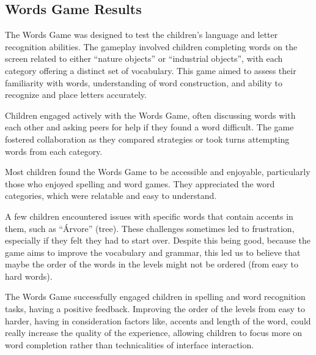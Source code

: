 \newpage
\subsection{Words Game Results}
The Words Game was designed to test the children's language and letter recognition abilities. The gameplay involved children completing words on the screen related to either ``nature objects'' or ``industrial objects'', with each category offering a distinct set of vocabulary. This game aimed to assess their familiarity with words, understanding of word construction, and ability to recognize and place letters accurately.

Children engaged actively with the Words Game, often discussing words with each other and asking peers for help if they found a word difficult. The game fostered collaboration as they compared strategies or took turns attempting words from each category.

Most children found the Words Game to be accessible and enjoyable, particularly those who enjoyed spelling and word games. They appreciated the word categories, which were relatable and easy to understand.

A few children encountered issues with specific words that contain accents in them, such as ``Árvore'' (tree). These challenges sometimes led to frustration, especially if they felt they had to start over. Despite this being good, because the game aims to improve the vocabulary and grammar, this led us to believe that maybe the order of the words in the levels might not be ordered (from easy to hard words).

The Words Game successfully engaged children in spelling and word recognition tasks, having a positive feedback. Improving the order of the levels from easy to harder, having in consideration factors like, accents and length of the word, could really increase the quality of the experience, allowing children to focus more on word completion rather than technicalities of interface interaction.





